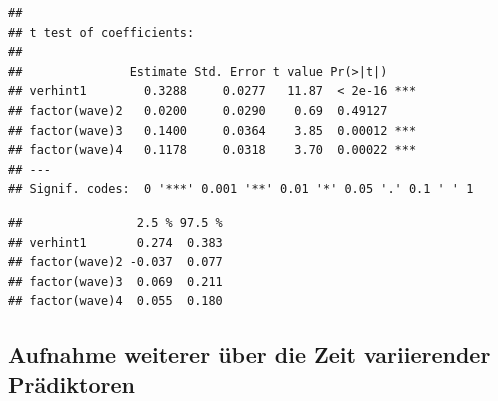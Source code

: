 \documentclass[
]{book}
\newenvironment{Shaded}{\begin{snugshade}}{\end{snugshade}}
\newcommand{\CommentTok}[1]{\textcolor[rgb]{0.56,0.35,0.01}{\textit{#1}}}
\newcommand{\DataTypeTok}[1]{\textcolor[rgb]{0.13,0.29,0.53}{#1}}
\newcommand{\KeywordTok}[1]{\textcolor[rgb]{0.13,0.29,0.53}{\textbf{#1}}}
\newcommand{\NormalTok}[1]{#1}
\newcommand{\OperatorTok}[1]{\textcolor[rgb]{0.81,0.36,0.00}{\textbf{#1}}}
\newcommand{\StringTok}[1]{\textcolor[rgb]{0.31,0.60,0.02}{#1}}
\begin{document}
\begin{Shaded}
\end{Shaded}

\begin{verbatim}
## 
## t test of coefficients:
## 
##               Estimate Std. Error t value Pr(>|t|)    
## verhint1        0.3288     0.0277   11.87  < 2e-16 ***
## factor(wave)2   0.0200     0.0290    0.69  0.49127    
## factor(wave)3   0.1400     0.0364    3.85  0.00012 ***
## factor(wave)4   0.1178     0.0318    3.70  0.00022 ***
## ---
## Signif. codes:  0 '***' 0.001 '**' 0.01 '*' 0.05 '.' 0.1 ' ' 1
\end{verbatim}

\begin{Shaded}
\end{Shaded}

\begin{verbatim}
##                2.5 % 97.5 %
## verhint1       0.274  0.383
## factor(wave)2 -0.037  0.077
## factor(wave)3  0.069  0.211
## factor(wave)4  0.055  0.180
\end{verbatim}

\hypertarget{aufnahme-weiterer-uxfcber-die-zeit-variierender-pruxe4diktoren}{%
\subsection*{Aufnahme weiterer über die Zeit variierender Prädiktoren}\label{aufnahme-weiterer-uxfcber-die-zeit-variierender-pruxe4diktoren}}
\end{document}

